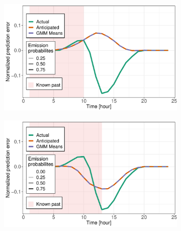 \documentclass[12pt]{report}
\begin{document}
\begin{figure}[htbp] 
	\begin{subfigure}[b]{0.5\linewidth}
		\centering
		\includegraphics[width=0.9\linewidth]{Images/PV/GMM/GMM_6Clust_Intraday_24d_10h_idtest98.pdf} 
	\end{subfigure}%
	\begin{subfigure}[b]{0.5\linewidth}
		\centering
		\includegraphics[width=0.9\linewidth]{Images/PV/GMM/GMM_6Clust_Intraday_24d_13h_idtest98.pdf} 
	\end{subfigure}
	

\end{figure}
\end{document}
